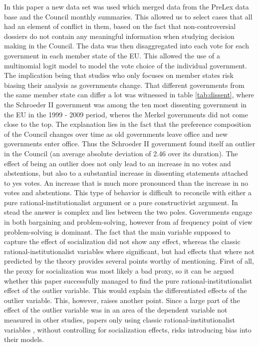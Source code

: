In this paper a new data set was used which merged data from the PreLex data base and the Council monthly summaries. This allowed us to select cases that all had an element of conflict in them, based on the fact that non-controversial dossiers do not contain any meaningful information when studying decision making in the Council. The data was then disaggregated into each vote for each government in each member state of the EU. This allowed the use of a multinomial logit model to model the vote choice of the individual government. The implication being that studies who only focuses on member states risk biasing their analysis as governments change. That different governments from the same member state can differ a lot was witnessed in table \ref{tab:dissent}, where the Schroeder II government was among the ten most dissenting government in the EU in the 1999 - 2009 period, wheres the Merkel governments did not come close to the top. The explanation lies in the fact that the preference composition of the Council changes over time as old governments leave office and new governments enter office. Thus the Schroeder II government found itself an outlier in the Council (an average absolute deviation of 2.46 over its duration). The effect of being an outlier does not only lead to an increase in no votes and abstentions, but also to a substantial increase in dissenting statements attached to yes votes. An increase that is much more pronounced than the increase in no votes and abstentions. This type of behavior is difficult to reconcile with either a pure rational-institutionalist argument or a pure constructivist argument. In stead the answer is complex and lies between the two poles. Governments engage in both bargaining and problem-solving, however from af frequency point of view problem-solving is dominant. The fact that the main variable supposed to capture the effect of socialization did not show any effect, whereas the classic rational-institutionalist variables where significant, but had effects that where not predicted by the theory provides several points worthy of mentioning. First of all, the proxy for socialization was most likely a bad proxy, so it can be argued whether this paper successfully managed to find the pure rational-institutionalist effect of the outlier variable. This would explain the differentiated effects of the outlier variable. This, however, raises another point. Since a large part of the effect of the outlier variable was in an area of the dependent variable not measured in other studies, papers only using classic rational-institutionalist variables , without controlling for socialization effects, risks introducing bias into their models. 


